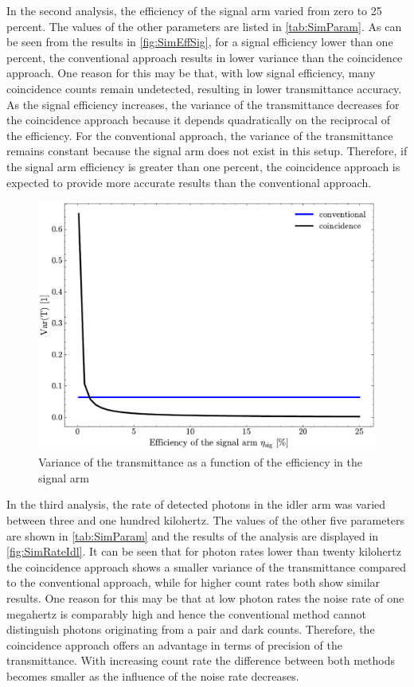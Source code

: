 In the second analysis, the efficiency of the signal arm varied from zero to 25 percent. The values of the other parameters are listed in \autoref{tab:SimParam}. As can be seen from the results in \autoref{fig:SimEffSig}, for a signal efficiency lower than one percent, the conventional approach results in lower variance than the coincidence approach. One reason for this may be that, with low signal efficiency, many coincidence counts remain undetected, resulting in lower transmittance accuracy. As the signal efficiency increases, the variance of the transmittance decreases for the coincidence approach because it depends quadratically on the reciprocal of the efficiency. For the conventional approach, the variance of the transmittance remains constant because the signal arm does not exist in this setup. Therefore, if the signal arm efficiency is greater than one percent, the coincidence approach is expected to provide more accurate results than the conventional approach.
\begin{figure}[tb!]
	\centering
	\includegraphics[width=.7\textwidth]{Images/SimulationSweepEffSig.pdf}
	\caption{Variance of the transmittance as a function of the efficiency in the signal arm}
	\label{fig:SimEffSig}
\end{figure}\newline
In the third analysis, the rate of detected photons in the idler arm was varied between three and one hundred kilohertz. The values of the other five parameters are shown in \autoref{tab:SimParam} and the results of the analysis are displayed in \autoref{fig:SimRateIdl}. It can be seen that for photon rates lower than twenty kilohertz the coincidence approach shows a smaller variance of the transmittance compared to the conventional approach, while for higher count rates both show similar results. One reason for this may be that at low photon rates the noise rate of one megahertz is comparably high and hence the conventional method cannot distinguish photons originating from a pair and dark counts. Therefore, the coincidence approach offers an advantage in terms of precision of the transmittance. With increasing count rate the difference between both methods becomes smaller as the influence of the noise rate decreases. 

